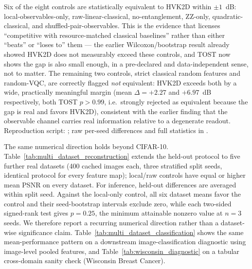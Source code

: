 \documentclass[11pt]{article}
\begin{document}
Six of the eight controls are statistically equivalent to HVK2D within $\pm1$~dB: local-observables-only, raw-linear-classical, no-entanglement, ZZ-only, quadratic-classical, and shuffled-pair-observables. This is the evidence that licenses ``competitive with resource-matched classical baselines'' rather than either ``beats'' or ``loses to'' them --- the earlier Wilcoxon/bootstrap result already showed HVK2D does not measurably exceed these controls, and TOST now shows the gap is also small enough, in a pre-declared and data-independent sense, not to matter. The remaining two controls, strict classical random features and random-VQC, are correctly flagged \emph{not} equivalent: HVK2D exceeds both by a wide, practically meaningful margin (mean $\Delta=+2.27$ and $+6.97$~dB respectively, both TOST $p>0.99$, i.e.\ strongly rejected as equivalent because the gap is real and favors HVK2D), consistent with the earlier finding that the observable channel carries real information relative to a degenerate readout. Reproduction script: ; raw per-seed differences and full statistics in .

The same numerical direction holds beyond CIFAR-10. Table~\ref{tab:multi_dataset_reconstruction} extends the held-out protocol to five further real datasets (400 cached images each, three stratified split seeds, identical protocol for every feature map); local/raw controls have equal or higher mean PSNR on every dataset. For inference, held-out differences are averaged within split seed. Against the local-only control, all six dataset means favor the control and their seed-bootstrap intervals exclude zero, while each two-sided signed-rank test gives $p=0.25$, the minimum attainable nonzero value at $n=3$ seeds. We therefore report a recurring numerical direction rather than a dataset-wise significance claim. Table~\ref{tab:multi_dataset_classification} shows the same mean-performance pattern on a downstream image-classification diagnostic using image-level pooled features, and Table~\ref{tab:wisconsin_diagnostic} on a tabular cross-domain sanity check (Wisconsin Breast Cancer).
\end{document}

